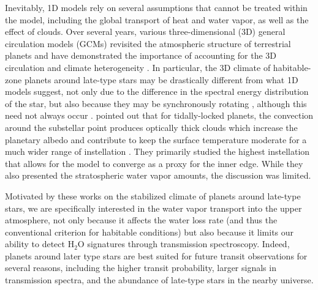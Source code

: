 \documentclass[11pt,numberedappendix,twocolappendix,]{emulateapj}
\def\water{H$_2$O}
\def\wv{water vapor}
\begin{document}
Inevitably, 1D models rely on several assumptions that cannot be treated within the model, including the global transport of heat and water vapor, as well as the effect of clouds. 
Over several years, various three-dimensional (3D) general circulation models (GCMs) revisited the atmospheric structure of terrestrial planets and have demonstrated the importance of accounting for the 3D circulation and climate heterogeneity \citep[e.g.][]{Ishiwatari2002,Abe2011,Leconte2013a,Leconte2013b,Wolf2014,Wolf2015}. 
In particular, the 3D climate of habitable-zone planets around late-type stars may be drastically different from what 1D models suggest, not only due to the difference in the spectral energy distribution of the star, but also because they may be synchronously rotating \citep{Dole1964, Kasting1993}, although this need not always occur \citep{Goldreich1966,Leconte2015}.  
%
\citet{Yang2013} pointed out that for tidally-locked planets, the convection around the substellar point produces optically thick clouds which increase the planetary albedo and contribute to keep the surface temperature moderate for a much wider range of instellation \citep[see also][]{Yang2014,Way2015,Kopparapu2016}. 
They primarily studied the highest instellation that allows for the model to converge as a proxy for the inner edge. 
While they also presented the stratospheric water vapor amounts, the discussion was limited. 

Motivated by these works on the stabilized climate of planets around late-type stars, we are specifically interested in the \wv{} transport into the upper atmosphere, not only because it affects the water loss rate (and thus the conventional criterion for habitable conditions) but also because it limits our ability to detect \water{} signatures through transmission spectroscopy. 
%
Indeed, planets around later type stars are best suited for future transit observations for several reasons, including the higher transit probability, larger signals in transmission spectra, and the abundance of late-type stars in the nearby universe. 
\end{document}
